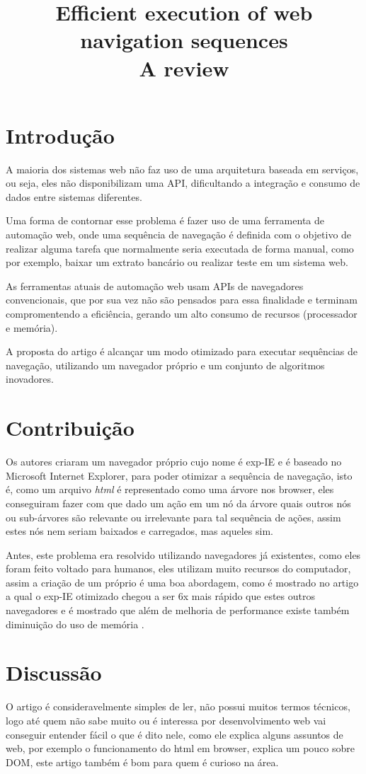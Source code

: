 \documentclass[conference]{IEEEtran}
\title{Efficient execution of web navigation sequences \cite{art:main}
  \\ A review}
\author{
  \IEEEauthorblockA{Universidade Federal de Alagoas -- Instituto de Computação
    \\ Professor: André Lage Freitas -- Matéria: Sistema Distribuídos}
  \IEEEauthorblockN{Revisado por: \textbf{Bruno da Silva Belo} (12110981)
    e \textbf{Iago Barbosa de Souza} (14210353) em 2016-08-13}
}
\begin{document}
\maketitle

\section{Introdução}
\label{sec:intro}
A maioria dos sistemas web não faz uso de uma arquitetura baseada em serviços, 
ou seja, eles não disponibilizam uma API, dificultando a integração e consumo 
de dados entre sistemas diferentes.

Uma forma de contornar esse problema é fazer uso de uma ferramenta de automação web, 
onde uma sequência de navegação é definida com o objetivo de realizar alguma tarefa que
normalmente seria executada de forma manual, como por exemplo, baixar um extrato 
bancário ou realizar teste em um sistema web.

As ferramentas atuais de automação web usam APIs de navegadores convencionais, 
que por sua vez não são pensados para essa finalidade e terminam compromentendo 
a eficiência, gerando um alto consumo de recursos (processador e memória).

A proposta do artigo é alcançar um modo otimizado para executar sequências de navegação, 
utilizando um navegador próprio e um conjunto de algoritmos inovadores.
\section{Contribuição}
\label{sec:contrib}
Os autores criaram um navegador próprio cujo nome é exp-IE e é baseado no
Microsoft Internet Explorer,  para poder otimizar a sequência de navegação, isto
é, como um arquivo \emph{html} é representado como uma árvore nos browser, eles
conseguiram fazer com que dado um ação em um nó da árvore quais outros nós ou
sub-árvores são relevante ou irrelevante para tal sequência de ações, assim
estes nós nem seriam baixados e carregados, mas aqueles sim.

Antes, este problema era resolvido utilizando navegadores já existentes, como
eles foram feito voltado para humanos, eles utilizam muito recursos do
computador, assim a criação de um próprio é uma boa abordagem, como é mostrado
no artigo a qual o exp-IE otimizado chegou a ser 6x mais rápido que estes outros
navegadores e é mostrado que além de melhoria de performance existe também
diminuição do uso de memória .
\section{Discussão}
\label{sec:discussao}
O artigo\cite{art:main} é consideravelmente simples de ler, não possui muitos
termos técnicos, logo até quem não sabe muito ou é interessa por desenvolvimento
web vai conseguir entender fácil o que é dito nele, como ele explica alguns
assuntos de web, por exemplo o funcionamento do html em browser, explica um
pouco sobre DOM, este artigo também é bom para quem é curioso na área.
\end{document}
